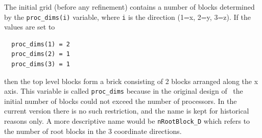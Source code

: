 The initial grid (before any refinement) contains
a number of blocks determined by the {\tt proc\_dims(i)} variable, where
{\tt i} is the direction (1=x, 2=y, 3=z).  If the values are set to
\begin{verbatim}
  proc_dims(1) = 2
  proc_dims(2) = 1
  proc_dims(3) = 1
\end{verbatim}
then the top level blocks form a brick consisting of 2 blocks arranged along the
x axis. This variable is called {\tt proc\_dims} because in the
original design of \BATSRUS\ the initial
number of blocks could not exceed the number of processors.
In the current version there is no such restriction, and
the name is kept for historical reasons only. A more descriptive
name would be {\tt nRootBlock\_D} which refers to the number
of root blocks in the 3 coordinate directions.

